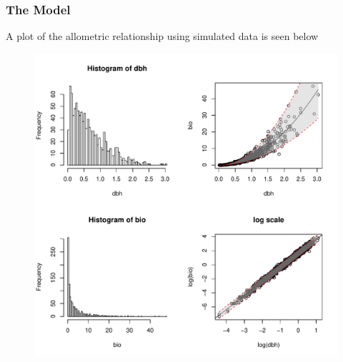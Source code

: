 \documentclass{beamer}
\begin{document}
\begin{frame}
  \frametitle{The Model}
  A plot of the allometric relationship using simulated data is seen below
  \begin{figure}
    \centering
    \includegraphics[scale = 0.25]{dbhModel}
  \end{figure}
\end{frame}
%
\end{document}
